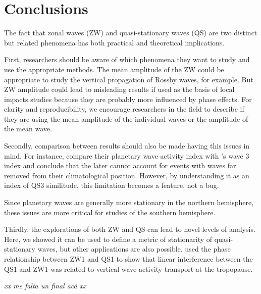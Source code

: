 \documentclass[draft,linenumbers]{agujournal2018}
\begin{document}
\section{Conclusions}

The fact that zonal waves (ZW) and quasi-stationary waves (QS) are two
distinct but related phenomena has both practical and theoretical
implications.

First, researchers should be aware of which phenomena they want to study
and use the appropriate methods. The mean amplitude of the ZW could be
appropriate to study the vertical propagation of Rossby waves, for
example. But ZW amplitude could lead to misleading results if used as
the basis of local impacts studies because they are probably more
influenced by phase effects. For clarity and reproducibility, we
encourage researchers in the field to describe if they are using the
mean amplitude of the individual waves or the amplitude of the mean
wave.

Secondly, comparison between results should also be made having this
issues in mind. For instance, \citet{Irving2015} compare their planetary
wave activity index with \citet{Raphael2004}'s wave 3 index and conclude
that the later cannot account for events with waves far removed from
their climatological position. However, by understanding it as an index
of QS3 similitude, this limitation becomes a feature, not a bug.

Since planetary waves are generally more stationary in the northern
hemisphere, these issues are more critical for studies of the southern
hemisphere.

Thirdly, the explorations of both ZW and QS can lead to novel levels of
analysis. Here, we showed it can be used to define a metric of
stationarity of quasi-stationary waves, but other applications are also
possible. \citet{Smith2012} used the phase relationship between ZW1 and
QS1 to show that linear interference between the QS1 and ZW1 was related
to vertical wave activity transport at the tropopause.

\emph{xx me falta un final acá xx}


\end{document}

